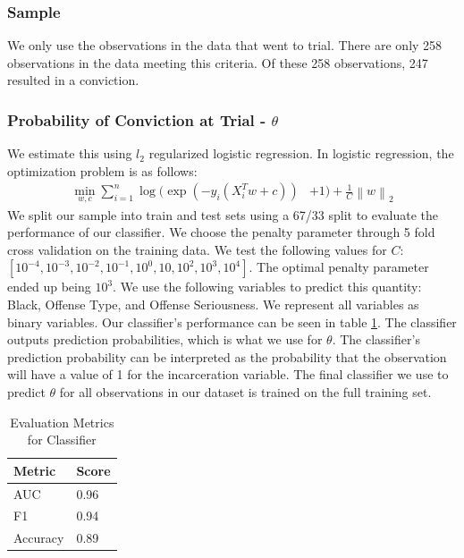 \documentclass[11pt, oneside]{article}   	%
\theoremstyle{ModifiedStyle}
\begin{document}
		\subsubsection{Sample}
			We only use the observations in the data that went to trial. There are only 258 observations in the data meeting this criteria. Of these 258 observations, 247 resulted in a conviction.

	  \subsubsection{Probability of Conviction at Trial - $\theta$}
	    \label{theta-estimation}
	    We estimate this using $l_2$ regularized logistic regression. In logistic regression, the optimization problem is as follows:
			\begin{align*}
				\min_{w,c} \sum_{i=1}^n \log(\exp(-y_i(X_i^Tw+c)) &+ 1) + \frac{1}{C} \left \| w \right \|_2
			\end{align*}
			We split our sample into train and test sets using a 67/33 split to evaluate the performance of our classifier. We choose the penalty parameter through 5 fold cross validation on the training data. We test the following values for $C$: $[10^{-4},10^{-3},10^{-2},10^{-1},10^{0},10,10^{2},10^{3},10^4]$. The optimal penalty parameter ended up being $10^3$. We use the following variables to predict this quantity: Black, Offense Type, and Offense Seriousness. We represent all variables as binary variables.  Our classifier's performance can be seen in table \ref{classifier-performance}. The classifier outputs prediction probabilities, which is what we use for $\theta$. The classifier's prediction probability can be interpreted as the probability that the observation will have a value of 1 for the incarceration variable. The final classifier we use to predict $\theta$ for all observations in our dataset is trained on the full training set.

	    \begin{table}[H]
	      \centering
	      \caption{Evaluation Metrics for Classifier}
	      \label{classifier-performance}
	      \begin{tabular}{|l|l|}
	      \hline
	      \textbf{Metric} & \textbf{Score} \\ \hline
	      AUC             & 0.96           \\ \hline
	      F1              & 0.94           \\ \hline
	      Accuracy        & 0.89           \\ \hline
	      \end{tabular}
	    \end{table}
\end{document}
